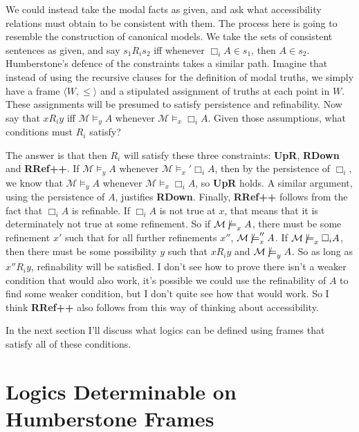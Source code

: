 \documentclass[
  11pt,
  letterpaper,
  DIV=11,
  numbers=noendperiod,
  twoside]{scrartcl}
\newcommand{\nmodels}{\mathrel{\ooalign{$\models$\cr\raisebox{-0.001ex}{\hss$\mkern-1mu/\hss$}\cr}}}
\begin{document}
We could instead take the modal facts as given, and ask what
accessibility relations must obtain to be consistent with them. The
process here is going to resemble the construction of canonical models.
We take the sets of consistent sentences as given, and say \(s_1R_is_2\)
iff whenever \(\Box_i A \in s_1\), then \(A \in s_2\). Humberstone's
defence of the constraints takes a similar path. Imagine that instead of
using the recursive clauses for the definition of modal truths, we
simply have a frame \(\langle W, \leqslant \rangle\) and a stipulated
assignment of truths at each point in \(W\). These assignments will be
presumed to satisfy persistence and refinability. Now say that \(xR_iy\)
iff \(\mathcal{M} \models_y A\) whenever
\(\mathcal{M} \models_x \Box_i A\). Given those assumptions, what
conditions must \(R_i\) satisfy?

The answer is that then \(R_i\) will satisfy these three constraints:
\textbf{UpR}, \textbf{RDown} and \textbf{RRef++}. If
\(\mathcal{M} \models_y A\) whenever
\(\mathcal{M} \models_x' \Box_i A\), then by the persistence of
\(\Box_i\), we know that \(\mathcal{M} \models_y A\) whenever
\(\mathcal{M} \models_x \Box_i A\), so \textbf{UpR} holds. A similar
argument, using the persistence of \(A\), justifies \textbf{RDown}.
Finally, \textbf{RRef++} follows from the fact that \(\Box_i A\) is
refinable. If \(\Box_i A\) is not true at \(x\), that means that it is
determinately not true at some refinement. So if
\(\mathcal{M} \nmodels_x A\), there must be some refinement \(x'\) such
that for all further refinements \(x''\),
\(\mathcal{M} \nmodels_x'' A\). If \(\mathcal{M} \nmodels_x \Box_i A\),
then there must be some possibility \(y\) such that \(xR_iy\) and
\(\mathcal{M} \nmodels_y A\). So as long as \(x''R_iy\), refinability
will be satisfied. I don't see how to prove there isn't a weaker
condition that would also work, it's possible we could use the
refinability of \(A\) to find some weaker condition, but I don't quite
see how that would work. So I think \textbf{RRef++} also follows from
this way of thinking about accessibility.

In the next section I'll discuss what logics can be defined using frames
that satisfy all of these conditions.

\section{Logics Determinable on Humberstone Frames}\label{sec-proof}
\end{document}
